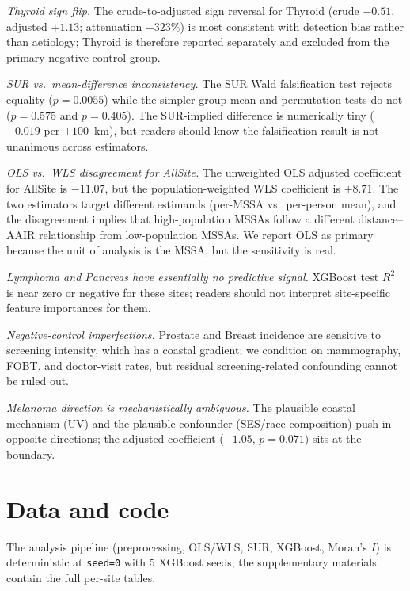 \documentclass[11pt]{article}
\begin{document}
\emph{Thyroid sign flip.} The crude-to-adjusted sign reversal for Thyroid (crude $-0.51$, adjusted $+1.13$; attenuation $+323\%$) is most consistent with detection bias rather than aetiology; Thyroid is therefore reported separately and excluded from the primary negative-control group.

\emph{SUR vs.\ mean-difference inconsistency.} The SUR Wald falsification test rejects equality ($p=0.0055$) while the simpler group-mean and permutation tests do not ($p=0.575$ and $p=0.405$). The SUR-implied difference is numerically tiny ($-0.019$ per $+100$~km), but readers should know the falsification result is not unanimous across estimators.

\emph{OLS vs.\ WLS disagreement for AllSite.} The unweighted OLS adjusted coefficient for AllSite is $-11.07$, but the population-weighted WLS coefficient is $+8.71$. The two estimators target different estimands (per-MSSA vs.\ per-person mean), and the disagreement implies that high-population MSSAs follow a different distance--AAIR relationship from low-population MSSAs. We report OLS as primary because the unit of analysis is the MSSA, but the sensitivity is real.

\emph{Lymphoma and Pancreas have essentially no predictive signal.} XGBoost test $R^2$ is near zero or negative for these sites; readers should not interpret site-specific feature importances for them.

\emph{Negative-control imperfections.} Prostate and Breast incidence are sensitive to screening intensity, which has a coastal gradient; we condition on mammography, FOBT, and doctor-visit rates, but residual screening-related confounding cannot be ruled out.

\emph{Melanoma direction is mechanistically ambiguous.} The plausible coastal mechanism (UV) and the plausible confounder (SES/race composition) push in opposite directions; the adjusted coefficient ($-1.05$, $p=0.071$) sits at the boundary.

\section*{Data and code}
The analysis pipeline (preprocessing, OLS/WLS, SUR, XGBoost, Moran's $I$) is deterministic at \texttt{seed=0} with 5 XGBoost seeds; the supplementary materials contain the full per-site tables.
\end{document}
